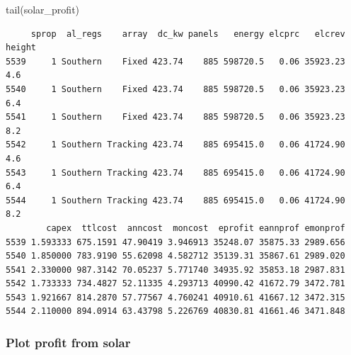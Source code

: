\documentclass[
  letterpaper,
  DIV=11,
  numbers=noendperiod]{scrartcl}
\newenvironment{Shaded}{\begin{snugshade}}{\end{snugshade}}
\newcommand{\FunctionTok}[1]{\textcolor[rgb]{0.28,0.35,0.67}{#1}}
\newcommand{\NormalTok}[1]{\textcolor[rgb]{0.00,0.23,0.31}{#1}}
\begin{document}
\begin{Shaded}
\begin{Highlighting}[]
\FunctionTok{tail}\NormalTok{(solar\_profit)}
\end{Highlighting}
\end{Shaded}

\begin{verbatim}
     sprop  al_regs    array  dc_kw panels   energy elcprc   elcrev height
5539     1 Southern    Fixed 423.74    885 598720.5   0.06 35923.23    4.6
5540     1 Southern    Fixed 423.74    885 598720.5   0.06 35923.23    6.4
5541     1 Southern    Fixed 423.74    885 598720.5   0.06 35923.23    8.2
5542     1 Southern Tracking 423.74    885 695415.0   0.06 41724.90    4.6
5543     1 Southern Tracking 423.74    885 695415.0   0.06 41724.90    6.4
5544     1 Southern Tracking 423.74    885 695415.0   0.06 41724.90    8.2
        capex  ttlcost  anncost  moncost  eprofit eannprof emonprof
5539 1.593333 675.1591 47.90419 3.946913 35248.07 35875.33 2989.656
5540 1.850000 783.9190 55.62098 4.582712 35139.31 35867.61 2989.020
5541 2.330000 987.3142 70.05237 5.771740 34935.92 35853.18 2987.831
5542 1.733333 734.4827 52.11335 4.293713 40990.42 41672.79 3472.781
5543 1.921667 814.2870 57.77567 4.760241 40910.61 41667.12 3472.315
5544 2.110000 894.0914 63.43798 5.226769 40830.81 41661.46 3471.848
\end{verbatim}

\subsubsection{Plot profit from solar}\label{plot-profit-from-solar}
\end{document}
